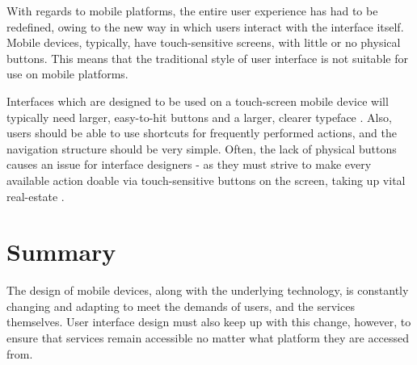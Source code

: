 \documentclass[a4paper,11pt]{article}
\begin{document}
    With regards to mobile platforms, the entire user experience has had to be
    redefined, owing to the new way in which users interact with the interface
    itself. Mobile devices, typically, have touch-sensitive screens, with
    little or no physical buttons. This means that the traditional style of
    user interface is not suitable for use on mobile platforms.

    Interfaces which are designed to be used on a touch-screen mobile device
    will typically need larger, easy-to-hit buttons and a larger, clearer
    typeface \cite{gong2004}. Also, users should be able to use shortcuts for
    frequently performed actions, and the navigation structure should be very
    simple. Often, the lack of physical buttons causes an issue for interface
    designers - as they must strive to make every available action doable via
    touch-sensitive buttons on the screen, taking up vital real-estate
    \cite{brewster2002}.

    \section{Summary}

    The design of mobile devices, along with the underlying technology, is
    constantly changing and adapting to meet the demands of users, and the
    services themselves. User interface design must also keep up with this
    change, however, to ensure that services remain accessible no matter what
    platform they are accessed from.

    
    
\end{document}
